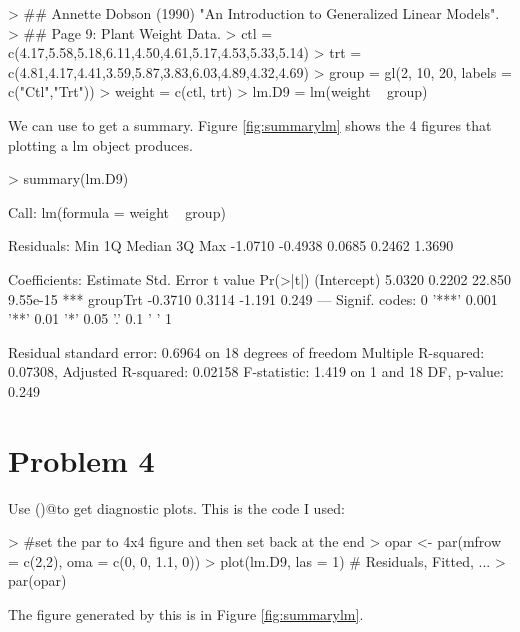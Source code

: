 \documentclass{article}
\begin{document}
\begin{Schunk}
\begin{Sinput}
> ## Annette Dobson (1990) "An Introduction to Generalized Linear Models".
> ## Page 9: Plant Weight Data.
> ctl = c(4.17,5.58,5.18,6.11,4.50,4.61,5.17,4.53,5.33,5.14)
> trt = c(4.81,4.17,4.41,3.59,5.87,3.83,6.03,4.89,4.32,4.69)
> group = gl(2, 10, 20, labels = c("Ctl","Trt"))
> weight = c(ctl, trt)
> lm.D9 = lm(weight ~ group)
\end{Sinput}
\end{Schunk}

We can use \verb@summary@ to get a summary. Figure \ref{fig:summarylm} shows the 4 figures that plotting a lm object produces.

\begin{Schunk}
\begin{Sinput}
> summary(lm.D9)
\end{Sinput}
\begin{Soutput}
Call:
lm(formula = weight ~ group)

Residuals:
    Min      1Q  Median      3Q     Max 
-1.0710 -0.4938  0.0685  0.2462  1.3690 

Coefficients:
            Estimate Std. Error t value Pr(>|t|)    
(Intercept)   5.0320     0.2202  22.850 9.55e-15 ***
groupTrt     -0.3710     0.3114  -1.191    0.249    
---
Signif. codes:  0 '***' 0.001 '**' 0.01 '*' 0.05 '.' 0.1 ' ' 1

Residual standard error: 0.6964 on 18 degrees of freedom
Multiple R-squared:  0.07308,	Adjusted R-squared:  0.02158 
F-statistic: 1.419 on 1 and 18 DF,  p-value: 0.249
\end{Soutput}
\end{Schunk}

\section*{Problem 4}

Use \verb@plot()@to get diagnostic plots.  This is the code I used:
\begin{Schunk}
\begin{Sinput}
> #set the par to 4x4 figure and then set back at the end
> opar <- par(mfrow = c(2,2), oma = c(0, 0, 1.1, 0))
> plot(lm.D9, las = 1)      # Residuals, Fitted, ...
> par(opar)
\end{Sinput}
\end{Schunk}
The figure generated by this is in Figure \ref{fig:summarylm}.
\end{document}
